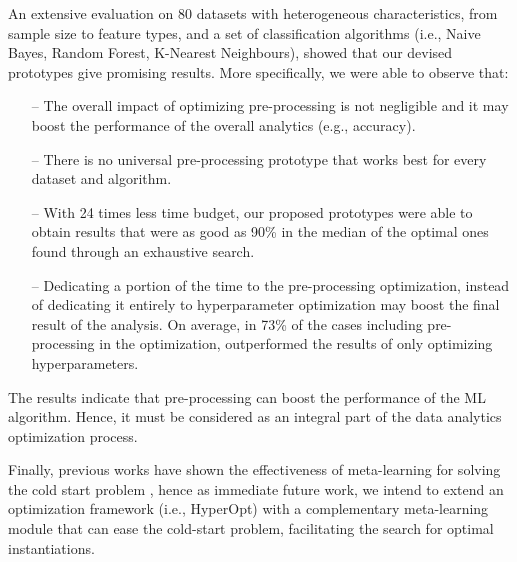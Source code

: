 An extensive evaluation on 80 datasets with heterogeneous characteristics, from sample size to feature types, and a set of classification algorithms (i.e., Naive Bayes, Random Forest, K-Nearest Neighbours), showed that our devised prototypes give promising results.
More specifically, we were able to observe that:
\begin{itemize}
    \item [--] The overall impact of optimizing pre-processing is not negligible and it may boost the performance of the overall analytics (e.g., accuracy).
    \item [--] There is no universal pre-processing prototype that works best for every dataset and algorithm.
    \item [--] With 24 times less time budget, our proposed prototypes were able to obtain results that were as good as 90\% in the median of the optimal ones found through an exhaustive search.
    \item [--] Dedicating a portion of the time to the pre-processing optimization, instead of dedicating it entirely to hyperparameter optimization may boost the final result of the analysis.
	On average, in 73\% of the cases including pre-processing in the optimization, outperformed the results of only optimizing hyperparameters.
\end{itemize}

The results indicate that pre-processing can boost the performance of the ML algorithm.
Hence, it must be considered as an integral part of the data analytics optimization process.

Finally, previous works have shown the effectiveness of meta-learning for solving the cold start problem \cite{Feurer15AAAI}, hence as immediate future work, we intend to extend an optimization framework (i.e., HyperOpt) with a complementary meta-learning module that can ease the cold-start problem, facilitating the search for optimal instantiations.